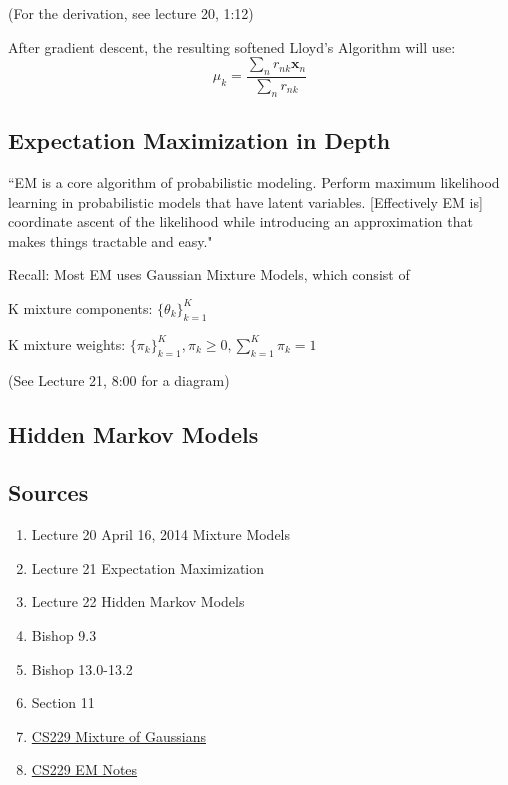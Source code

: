 \documentclass[11pt, oneside]{article}   	%
\begin{document}
(For the derivation, see lecture 20, 1:12)

After gradient descent, the resulting softened Lloyd's Algorithm will use:
\[
\mu_k = \frac{\displaystyle{\sum_n r_{nk}\mathbf{x}_n}} {\displaystyle{\sum_n r_{nk}}}
\]

\subsection{Expectation Maximization in Depth}

``EM is a core algorithm of probabilistic modeling. Perform maximum likelihood learning in probabilistic models that have latent variables. [Effectively EM is] coordinate ascent of the likelihood while introducing an approximation that makes things tractable and easy."

Recall: Most EM uses Gaussian Mixture Models, which consist of

K mixture components: $\{ \theta_k \}_{k=1}^K$

K mixture weights: $\{ \pi_k \}_{k=1}^K, \pi_k \ge 0, \sum_{k=1}^K \pi_k = 1$

(See Lecture 21, 8:00 for a diagram)





\subsection{Hidden Markov Models}

\subsection{Sources}

\begin{enumerate}
	\item Lecture 20 April 16, 2014 Mixture Models
	\item Lecture 21 Expectation Maximization
	\item Lecture 22 Hidden Markov Models
	\item Bishop 9.3
	\item Bishop 13.0-13.2
	\item Section 11
	\item \href{http://cs229.stanford.edu/notes/cs229-notes7b.pdf}{CS229 Mixture of Gaussians}
	\item \href{http://cs229.stanford.edu/notes/cs229-notes8.pdf}{CS229 EM Notes}
\end{enumerate}
\end{document}
